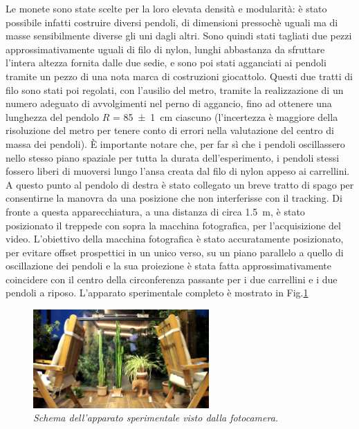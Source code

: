 \documentclass[11pt, a4paper, twoside]{article}
\begin{document}
Le monete sono state scelte per la loro elevata densità e modularità: è 
stato possibile infatti costruire diversi pendoli, di dimensioni pressochè
uguali ma di masse sensibilmente diverse gli uni dagli altri.
Sono quindi stati tagliati due pezzi approssimativamente
uguali di filo di nylon, lunghi abbastanza da sfruttare l'intera altezza 
fornita dalle due sedie, e sono poi stati agganciati ai pendoli tramite un pezzo di una nota 
marca di costruzioni giocattolo. Questi due tratti di filo sono stati poi regolati,
con l'ausilio del metro,
tramite la realizzazione di un numero adeguato di avvolgimenti nel perno di 
aggancio, fino ad ottenere una lunghezza del pendolo $R$ = \SI{85 \pm 1}{\centi\m} ciascuno (l'incertezza è 
maggiore della risoluzione del metro per tenere conto di errori nella valutazione del centro
di massa dei pendoli).
È importante notare che, per far sì che i pendoli oscillassero nello stesso piano
spaziale per tutta la durata dell'esperimento, i pendoli stessi fossero
liberi di muoversi lungo l'ansa creata dal filo di nylon appeso ai carrellini. 
A questo punto al pendolo di destra è stato collegato un breve tratto di spago 
per consentirne la manovra da una posizione che non interferisse con il tracking.
Di fronte a questa apparecchiatura, a una distanza di circa \SI{1.5}{\m}, è stato 
posizionato il treppede con sopra la macchina fotografica, per l'acquisizione
del video.
L'obiettivo della macchina fotografica è stato accuratamente posizionato, per evitare
offset prospettici in un unico verso, su un piano parallelo a quello di oscillazione dei
pendoli e la sua proiezione è stata fatta approssimativamente coincidere con il
centro della circonferenza passante per i due carrellini e i due pendoli a 
riposo.
L'apparato sperimentale completo è mostrato in Fig.\ref{setup_exp}

\begin{figure}[h!]
  \centering
  \includegraphics[width=0.6\textwidth]{../../media/img/setup_exp.png}
  \caption{\textit{Schema dell'apparato sperimentale visto dalla fotocamera.}}
  \label{setup_exp}
\end{figure}
\end{document}
